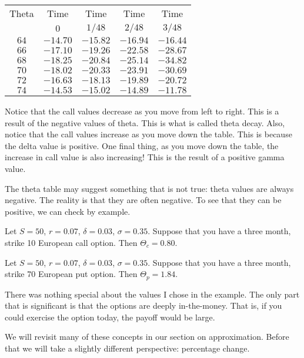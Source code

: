 \documentclass{ximera}
\begin{document}
\begin{center}
\vspace{25pt}
	\begin{tabular}{c|cccc}
	Theta		& Time 	& Time 		& Time 		& Time\\
		 	& $0$ 		& $1/48$ 		& $2/48$ 		& $3/48$\\
	\hline
	$64$		& $-14.70$	& $-15.82$		& $-16.94$		& $-16.44$\\
	$66$		& $-17.10$	& $-19.26$		& $-22.58$		& $-28.67$\\
	$68$		& $-18.25$	& $-20.84$		& $-25.14$		& $-34.82$\\
	$70$		& $-18.02$	& $-20.33$		& $-23.91$		& $-30.69$\\
	$72$		& $-16.63$	& $-18.13$		& $-19.89$		& $-20.72$\\
	$74$		& $-14.53$	& $-15.02$		& $-14.89$		& $-11.78$
	\end{tabular}
\end{center}

Notice that the call values decrease as you move from left to right. This is a result of the negative values of theta. This is what is called theta decay. Also, notice that the call values increase as you move down the table. This is because the delta value is positive. One final thing, as you move down the table, the increase in call value is also increasing! This is the result of a positive gamma value. 

The theta table may suggest something that is not true: theta values are always negative. The reality is that they are often negative. To see that they can be positive, we can check by example.

\begin{example}
Let $S=50$, $r=0.07$, $\delta=0.03$, $\sigma=0.35$. Suppose that you have a three month, strike 10 European call option. Then $\Theta_c=0.80$.

Let $S=50$, $r=0.07$, $\delta=0.03$, $\sigma=0.35$. Suppose that you have a three month, strike 70 European put option. Then $\Theta_p=1.84$. 
\end{example}

There was nothing special about the values I chose in the example. The only part that is significant is that the options are deeply in-the-money. That is, if you could exercise the option today, the payoff would be large. 

We will revisit many of these concepts in our section on approximation. Before that we will take a slightly different perspective: percentage change. 
\end{document}
